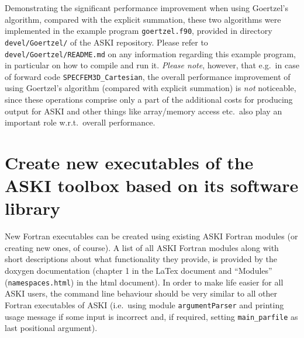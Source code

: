 \documentclass[12pt,a4paper]{article}
\newcommand{\lcode}[1]{\nolinkurl{#1}}
\newcommand{\ASKI}{ {\ttfamily ASKI} }
\begin{document}
Demonstrating the significant performance improvement when using Goertzel's algorithm, compared with the
explicit summation, these two algorithms were implemented in the example
program \lcode{goertzel.f90}, provided in directory \lcode{devel/Goertzel/} of the \ASKI{} repository. Please 
refer to \lcode{devel/Goertzel/README.md} on any information regarding this example program, in particular 
on how to compile and run it.
\emph{Please note}, however, that e.g.\ in case of forward code \lcode{SPECFEM3D_Cartesian}, the overall
performance improvement of using Goertzel's algorithm (compared with explicit summation) is \emph{not}
noticeable, since these operations comprise only a part of the additional costs for producing output for \ASKI{}
and other things like array/memory access etc.\ also play an important role w.r.t.\ overall performance.


\section{Create new executables of the \ASKI{} toolbox based on its software library} \label{sec:executables}
%
New Fortran executables can be created using existing \ASKI{} Fortran modules (or creating new ones, of course). 
A list of all \ASKI{} Fortran modules along with short descriptions about what functionality they provide, is
provided by the doxygen documentation (chapter 1 in the LaTex document and ``Modules'' (\lcode{namespaces.html})
in the html document).
In order to make life easier for all \ASKI{} users, the command line behaviour should be very similar to all
other Fortran executables of \ASKI{} (i.e.\ using module \lcode{argumentParser} and printing usage message
if some input is incorrect and, if required, setting \lcode{main_parfile} as last positional argument).
\end{document}

